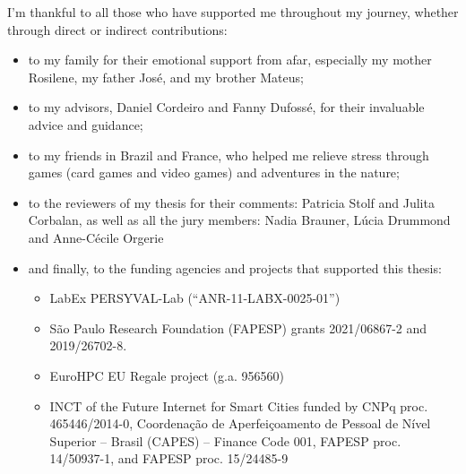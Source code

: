 I'm thankful to all those who have supported me throughout my journey, whether through direct or indirect contributions:

\begin{itemize}
    \item to my family for their emotional support from afar, especially my mother Rosilene, my father José, and my brother Mateus;
    \item to my advisors, Daniel Cordeiro and Fanny Dufossé, for their invaluable advice and guidance;
    \item to my friends in Brazil and France, who helped me relieve stress through games (card games and video games) and adventures in the nature;
    \item to the reviewers of my thesis for their comments: Patricia Stolf and Julita Corbalan, as well as all the jury members: Nadia Brauner, Lúcia Drummond and Anne-Cécile Orgerie
    \item and finally, to the funding agencies and projects that supported this thesis:
    \begin{itemize}
      \item LabEx PERSYVAL-Lab (``ANR-11-LABX-0025-01'')
      \item São Paulo Research Foundation (FAPESP) grants 2021/06867-2 and 2019/26702-8.
      \item EuroHPC EU Regale project (g.a. 956560)
      \item INCT of the Future Internet for Smart Cities funded by CNPq proc. 465446/2014-0, Coordenação de Aperfeiçoamento de Pessoal de Nível Superior – Brasil (CAPES) – Finance Code 001, FAPESP proc. 14/50937-1, and FAPESP proc. 15/24485-9

    \end{itemize}
\end{itemize}